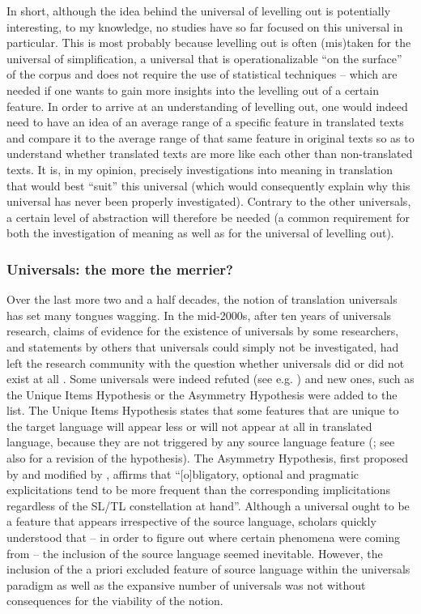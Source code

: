 In short, although the idea behind the universal of levelling out is potentially interesting, to my knowledge, no studies have so far focused on this universal in particular. This is most probably because levelling out is often (mis)taken for the universal of simplification, a universal that is operationalizable ``on the surface'' of the corpus and does not require the use of statistical techniques -- which are needed if one wants to gain more insights into the levelling out of a certain feature. In order to arrive at an understanding of levelling out, one would indeed need to have an idea of an average range of a specific feature in translated texts and compare it to the average range of that same feature in original texts so as to understand whether translated texts are more like each other than non-translated texts. It is, in my opinion, precisely investigations into meaning in translation that would best ``suit'' this universal (which would consequently explain why this universal has never been properly investigated). Contrary to the other universals, a certain level of abstraction will therefore be needed (a common requirement for both the investigation of meaning as well as for the universal of levelling out).

\subsubsection{Universals: the more the merrier?}
\label{sec:2.2.2.5}  
Over the last more two and a half decades, the notion of translation universals has set many tongues wagging. In the mid-2000s, after ten years of universals research, claims of evidence for the existence of universals by some researchers, and statements by others that universals could simply not be investigated, had left the research community with the question whether universals did or did not exist at all \citep[1]{Mauranen2004}. Some universals were indeed refuted (see e.g. \citealt{becher_abandoning_2010}) and new ones, such as the Unique Items Hypothesis  \citep{mauranen_unique_2004} or the Asymmetry Hypothesis \citep{dimitriu_asymmetry_2009} were added to the list. The Unique Items Hypothesis states that some features that are unique to the target language will appear less or will not appear at all in translated language, because they are not triggered by any source language feature  (\citealt{mauranen_unique_2004}; see also \citealt{gambier_what_2004} for a revision of the hypothesis). The Asymmetry Hypothesis, first proposed by \citet{dimitriu_asymmetry_2009} and modified by \citet{becher_abandoning_2010}, affirms that “[o]bligatory, optional and pragmatic explicitations tend to be more frequent than the corresponding implicitations regardless of the SL\slash TL constellation at hand”. Although a universal ought to be a feature that appears irrespective of the source language, scholars quickly understood that – in order to figure out where certain phenomena were coming from – the inclusion of the source language seemed inevitable. However, the inclusion of the a priori excluded feature of source language within the universals paradigm as well as the expansive number of universals was not without consequences for the viability of the notion. 

